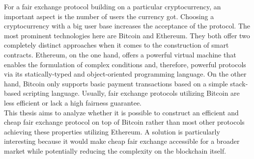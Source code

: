 \documentclass{cacthesis}
\newcounter{protocol}
\begin{document}
        For a fair exchange protocol building on a particular cryptocurrency, an important aspect is the number of users the currency got. Choosing a cryptocurrency with a big user base increases the acceptance of the protocol. The most prominent technologies here are Bitcoin and Ethereum. They both offer two completely distinct approaches when it comes to the construction of smart contracts. Ethereum, on the one hand, offers a powerful virtual machine that enables the formulation of complex conditions and, therefore, powerful protocols via its statically-typed and object-oriented programming language. On the other hand, Bitcoin only supports basic payment transactions based on a simple stack-based scripting language. Usually, fair exchange protocols utilizing Bitcoin are less efficient or lack a high fairness guarantee. \\
        This thesis aims to analyze whether it is possible to construct an efficient and cheap fair exchange protocol on top of Bitcoin rather than most other protocols achieving these properties utilizing Ethereum. A solution is particularly interesting because it would make cheap fair exchange accessible for a broader market while potentially reducing the complexity on the blockchain itself.
        
\end{document}
